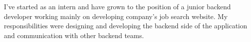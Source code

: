 I’ve started as an intern and have grown to the position of a junior backend developer working mainly on developing company’s job search website. My responsibilities were designing and developing the backend side of the application and communication with other backend teams.
